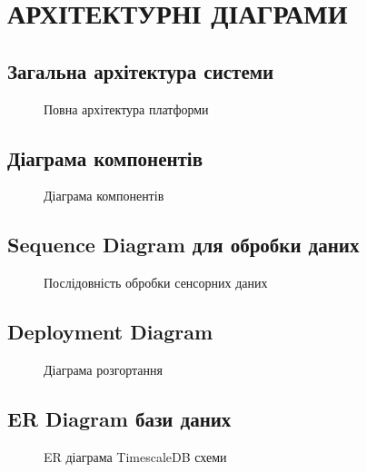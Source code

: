 \chapter{АРХІТЕКТУРНІ ДІАГРАМИ}

\section{Загальна архітектура системи}

\begin{figure}[h]
\centering
\caption{Повна архітектура платформи}
\label{fig:full_architecture}
\end{figure}

\section{Діаграма компонентів}

\begin{figure}[h]
\centering
\caption{Діаграма компонентів}
\label{fig:components}
\end{figure}

\section{Sequence Diagram для обробки даних}

\begin{figure}[h]
\centering
\caption{Послідовність обробки сенсорних даних}
\label{fig:sequence}
\end{figure}

\section{Deployment Diagram}

\begin{figure}[h]
\centering
\caption{Діаграма розгортання}
\label{fig:deployment}
\end{figure}

\section{ER Diagram бази даних}

\begin{figure}[h]
\centering
\caption{ER діаграма TimescaleDB схеми}
\label{fig:er_diagram}
\end{figure}
